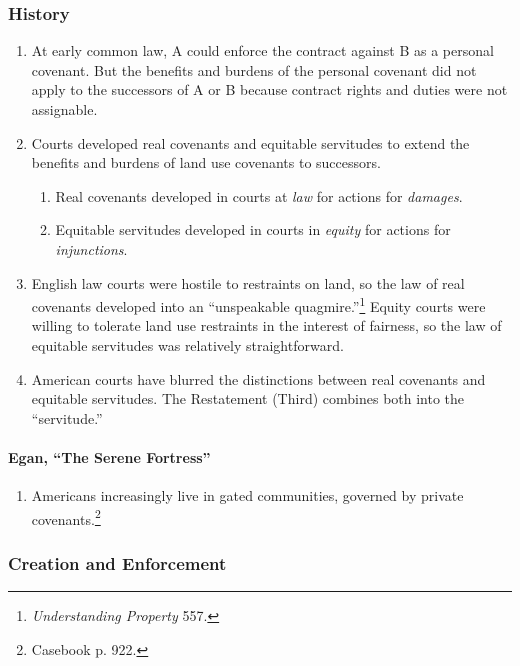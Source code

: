 \subsubsection{History}

\begin{enumerate}
    \item At early common law, A could enforce the contract against B as a 
    personal covenant. But the benefits and burdens of the personal covenant 
    did not apply to the successors of A or B because contract rights and 
    duties were not assignable.
    \item Courts developed real covenants and equitable servitudes to extend 
    the benefits and burdens of land use covenants to successors.
    \begin{enumerate}
        \item Real covenants developed in courts at \emph{law} for actions for 
        \emph{damages}.
        \item Equitable servitudes developed in courts in \emph{equity} for 
        actions for \emph{injunctions}.
    \end{enumerate}
    \item English law courts were hostile to restraints on land, so the law of 
    real covenants developed into an ``unspeakable 
    quagmire.''\footnote{\emph{Understanding Property} 557.} Equity courts 
    were willing to tolerate land use restraints in the interest of fairness, 
    so the law of equitable servitudes was relatively straightforward.
    \item American courts have blurred the distinctions between real covenants 
    and equitable servitudes. The Restatement (Third) combines both into the 
    ``servitude.''
\end{enumerate}

\paragraph{Egan, ``The Serene Fortress''}

\begin{enumerate}
    \item Americans increasingly live in gated communities, governed by 
    private covenants.\footnote{Casebook p. 922.}
\end{enumerate}

\subsubsection{Creation and Enforcement}


